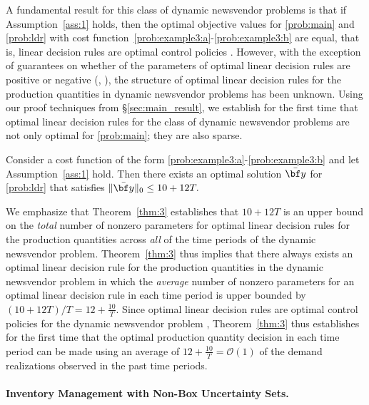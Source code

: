\documentclass[nonblindrev,mnsc]{informs3} %
\newcommand{\by}{{\bf y}}
\begin{document}
A fundamental result for this class of dynamic newsvendor problems  is that if Assumption~\ref{ass:1} holds, then the optimal objective values for \eqref{prob:main} and \eqref{prob:ldr} with  cost function~\eqref{prob:example3:a}-\eqref{prob:example3:b} are equal, that is, linear decision rules are optimal control policies  \cite[Theorem 3.1]{bertsimas2010optimality}. However, with the exception of guarantees on whether of the parameters of optimal linear decision rules are positive or negative (\cite[Proposition 5.1]{bertsimas2010optimality}, \cite[Lemma 5]{iancu2013supermodularity}), the structure of optimal linear decision rules for the production quantities in dynamic newsvendor problems has been unknown. Using our proof techniques from  \S\ref{sec:main_result}, we establish  for the first time that optimal linear decision rules for the class of dynamic newsvendor problems are not only optimal for \eqref{prob:main}; they are also sparse.
\begin{theorem}\label{thm:3}
Consider a cost function of the form \eqref{prob:example3:a}-\eqref{prob:example3:b} and let   Assumption~\ref{ass:1} hold. Then there exists an optimal solution $\bar{\by}$ for \eqref{prob:ldr} that satisfies $\| \bar{\by} \|_0 \le 10+12T.$
\end{theorem}

We emphasize that Theorem~\ref{thm:3} establishes that $10+12T$ is an upper bound on the \emph{total} number of nonzero parameters for optimal linear decision rules for the production quantities across \emph{all} of the time periods of the dynamic newsvendor problem. Theorem~\ref{thm:3} thus implies that there always exists an optimal linear decision rule  for the production quantities in the dynamic newsvendor problem in which the \emph{average} number of nonzero parameters for an optimal  linear decision rule in each time period is upper bounded by $(10+12T)/T = 12 + \frac{10}{T}.$ Since optimal linear decision rules are optimal control policies for the dynamic newsvendor problem  \cite[Theorem 3.1]{bertsimas2010optimality}, Theorem~\ref{thm:3} thus establishes for the first time  that the optimal production quantity decision in each time period can be made using an average of $12 + \frac{10}{T} = \mathcal{O}(1)$ of the demand realizations observed in the past time periods.





\paragraph{Inventory Management with Non-Box  Uncertainty Sets.}
\end{document}
